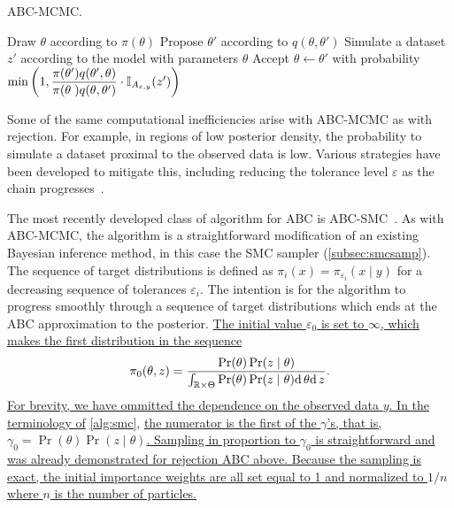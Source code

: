 \begin{algorithm}
  \caption{\gls{ABC}-\gls{MCMC}.}
  \begin{algorithmic}
    \State Draw $\theta$ according to $\pi(\theta)$
    \Loop
      \State Propose $\theta'$ according to $q(\theta, \theta')$
      \State Simulate a dataset $z'$ according to the model with parameters
             $\theta$
      \State Accept $\theta \gets \theta'$ with probability
      $\min \left( 1, 
       \dfrac{\pi(\theta') q(\theta', \theta)}
             {\pi(\theta\phantom{'}) q(\theta, \theta')} 
       \cdot \mathbb{I}_{A_{\varepsilon, y}}(z') \right)$
    \EndLoop
  \end{algorithmic}
  \label{alg:abcmcmc}
\end{algorithm}

Some of the same computational inefficiencies arise with \gls{ABC}-\gls{MCMC}
as with rejection. For example, in regions of low posterior density, the
probability to simulate a dataset proximal to the observed data is low. Various
strategies have been developed to mitigate this, including reducing the
tolerance level $\varepsilon$ as the chain
progresses~\autocite{ratmann2007using}.

The most recently developed class of algorithm for \gls{ABC} is
\gls{ABC}-\gls{SMC}~\autocite{sisson2007sequential, beaumont2009adaptive}. As
with \gls{ABC}-\gls{MCMC}, the algorithm is a straightforward modification of
an existing Bayesian inference method, in this case the \gls{SMC} sampler
(\cref{subsec:smcsamp}). The sequence of target distributions is defined as
$\pi_i(x) = \pi_{\varepsilon_i}(x \mid y)$ for a decreasing sequence of
tolerances $\varepsilon_i$. The intention is for the algorithm to progress
smoothly through a sequence of target distributions which ends at the \gls{ABC}
approximation to the posterior. {\color{blue}\uline{The initial value
$\varepsilon_0$ is set to $\infty$, which makes the first distribution in the
sequence}
\[
  \pi_0(\theta, z) = \frac{\Pr(\theta) \Pr(z \mid \theta)}
               {\int_{\mathbb{R} \times \Theta} \Pr(\theta) \Pr(z \mid \theta) \mathrm{d}\,\theta \mathrm{d}\, z}.
\]
\uline{For brevity, we have ommitted the dependence on the observed data $y$.
In the terminology of} \cref{alg:smc}, \uline{the numerator is the first of the
$\gamma$'s, that is, $\gamma_0 = \Pr(\theta) \Pr(z \mid \theta)$. Sampling in
proportion to $\gamma_0$ is straightforward and was already demonstrated for
rejection \gls{ABC} above. Because the sampling is exact, the initial
importance weights are all set equal to 1 and normalized to $1/n$ where $n$ is
the number of particles.}}

